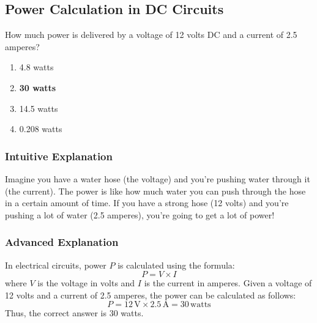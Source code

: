 \subsection{Power Calculation in DC Circuits}
\label{T5C10}

\begin{tcolorbox}[colback=gray!10!white,colframe=black!75!black,title=T5C10]
How much power is delivered by a voltage of 12 volts DC and a current of 2.5 amperes?
\begin{enumerate}[noitemsep]
    \item 4.8 watts
    \item \textbf{30 watts}
    \item 14.5 watts
    \item 0.208 watts
\end{enumerate}
\end{tcolorbox}

\subsubsection*{Intuitive Explanation}
Imagine you have a water hose (the voltage) and you're pushing water through it (the current). The power is like how much water you can push through the hose in a certain amount of time. If you have a strong hose (12 volts) and you're pushing a lot of water (2.5 amperes), you're going to get a lot of power!

\subsubsection*{Advanced Explanation}
In electrical circuits, power \( P \) is calculated using the formula:
\[
P = V \times I
\]
where \( V \) is the voltage in volts and \( I \) is the current in amperes. Given a voltage of 12 volts and a current of 2.5 amperes, the power can be calculated as follows:
\[
P = 12 \, \text{V} \times 2.5 \, \text{A} = 30 \, \text{watts}
\]
Thus, the correct answer is 30 watts.